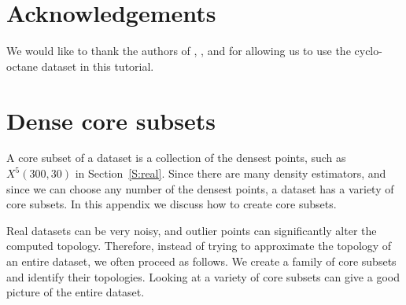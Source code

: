 \documentclass[amscd, amssymb, verbatim]{amsart}[12pt]
\theoremstyle{remark}
\theoremstyle{remark}
\theoremstyle{remark}
\begin{document}




\section{Acknowledgements}

We would like to thank the authors of  \cite{brown2008algorithmic}, \cite{martin2010topology}, and \cite{martin2011non} for allowing us to use the cyclo-octane dataset in this tutorial.




\appendix
\appendixpage
\addappheadtotoc




\section{Dense core subsets}\label{A:core}

A core subset of a dataset is a collection of the densest points, such as $X^5(300,30)$ in Section~\ref{S:real}. Since there are many density estimators, and since we can choose any number of the densest points, a dataset has a variety of core subsets. In this appendix we discuss how to create core subsets. 

Real datasets can be very noisy, and outlier points can significantly alter the computed topology. Therefore, instead of trying to approximate the topology of an entire dataset, we often proceed as follows. We create a family of core subsets and identify their topologies. Looking at a variety of core subsets can give a good picture of the entire dataset. 
\end{document}
